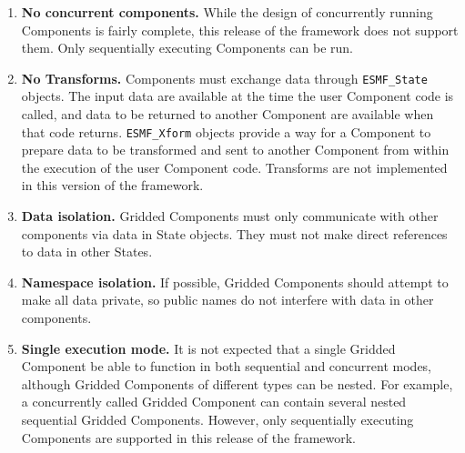 %


\begin{enumerate}

\item {\bf No concurrent components.}  While the design of concurrently 
running Components is fairly complete, this release of the framework does 
not support them.  Only sequentially executing Components can be run.

\item {\bf No Transforms.}  Components must exchange data through   
{\tt ESMF\_State} objects.  The input data are available at the time 
the user Component code is called, and data to be returned to another 
Component are available when that code returns.  
{\tt ESMF\_Xform} objects provide a way for
a Component to prepare data to be transformed and 
sent to another Component from within the execution of 
the user Component code.
Transforms are not implemented in this version of the framework.

\item {\bf Data isolation.} 
Gridded Components must only communicate with other
components via data in State objects.  They must 
not make direct references to data in other States.

\item {\bf Namespace isolation.}
If possible, Gridded Components should attempt to make 
all data private, so public names do not interfere with data 
in other components.

\item {\bf Single execution mode.}
It is not expected that a single Gridded Component be able 
to function in both sequential and concurrent modes, although 
Gridded Components of different types can be nested. For example,
a concurrently called Gridded Component can contain several nested 
sequential Gridded Components.   However, only sequentially executing
Components are supported in this release of the framework.

\end{enumerate}
